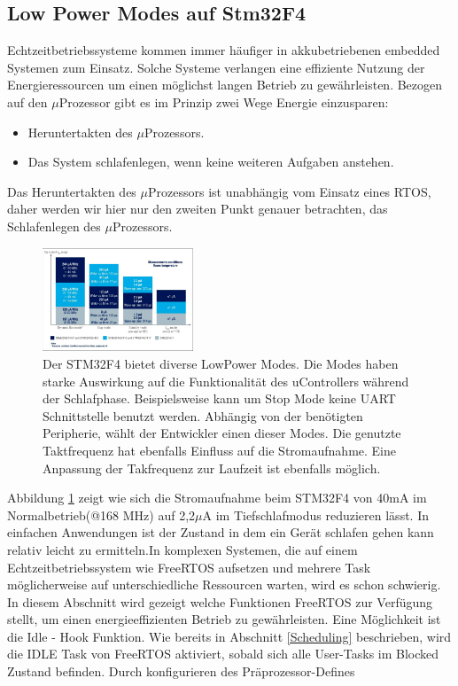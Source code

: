 \subsection{Low Power Modes auf Stm32F4}
\label{sec:Low Power Modes}
Echtzeitbetriebssysteme kommen immer häufiger in akkubetriebenen embedded Systemen zum Einsatz. Solche Systeme verlangen eine effiziente Nutzung der Energieressourcen um einen möglichst langen Betrieb zu ge\-währ\-leis\-ten. Bezogen auf den $\mu$\-Pro\-zesso\-r gibt es im Prinzip zwei Wege Energie einzusparen:
\begin{itemize}
	\item Heruntertakten des $\mu$\-Pro\-zesso\-rs.
	\item Das System schlafenlegen, wenn keine weiteren Aufgaben anstehen.
\end{itemize}
Das Heruntertakten des $\mu$\-Pro\-zesso\-rs ist unabhängig vom Einsatz eines RTOS, daher werden wir hier nur den zweiten Punkt genauer betrachten, das Schlafenlegen des $\mu$\-Pro\-zesso\-rs. 
\begin{figure}[htb!]
	\centering
		\includegraphics[width=0.4\textwidth]{Pictures/STM32F4/powerConsumption.png}
	\caption{Der STM32F4 bietet diverse LowPower Modes. Die Modes haben starke Auswirkung auf die Funktionalität des uControllers während der Schlafphase. Beispielsweise kann um Stop Mode keine UART Schnittstelle benutzt werden. Abhängig von der benötigten Peripherie, wählt der Entwickler einen dieser Modes. Die genutzte Taktfrequenz hat ebenfalls Einfluss auf die Stromaufnahme. Eine Anpassung der Takfrequenz zur Laufzeit ist ebenfalls möglich.}
	\label{fig:powerconsum}
\end{figure}
Abbildung \ref{fig:powerconsum} zeigt wie sich die Stromaufnahme beim STM32F4 von 40mA im Normalbetrieb(@168 MHz) auf 2,2$\mu$A im Tiefschlafmodus reduzieren lässt. 
In einfachen Anwendungen ist der Zustand in dem ein Gerät schlafen gehen kann relativ leicht zu ermitteln.\newline In komplexen Systemen, die auf einem Echtzeitbetriebssystem wie FreeRTOS aufsetzen und mehrere Task mög\-li\-cherweise auf unterschiedliche Ressourcen warten, wird es schon schwierig. In diesem Abschnitt wird gezeigt welche Funktionen FreeRTOS zur Ver\-fü\-gung stellt, um einen energieeffizienten Betrieb zu ge\-währ\-leis\-ten. Eine Mög\-lich\-keit ist die Idle - Hook Funktion. Wie bereits in Abschnitt \ref{Scheduling} beschrieben, wird die IDLE Task von FreeRTOS aktiviert, sobald sich alle User-Tasks im Blocked Zustand befinden. Durch konfigurieren des Präprozessor-Defines        
